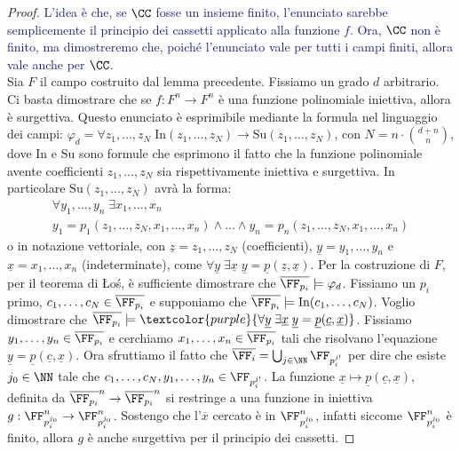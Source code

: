 \begin{proof}
    \textcolor{MidnightBlue}{L'idea è che, se $\CC$ fosse un insieme finito, l'enunciato sarebbe semplicemente il principio dei cassetti applicato alla funzione $f$. Ora, $\CC$ non è finito, ma dimostreremo che,
    poiché l'enunciato vale per tutti i campi finiti, allora vale anche per $\CC$.}\\
    Sia $F$ il campo costruito dal lemma precedente. Fissiamo un grado $d$ arbitrario. Ci basta dimostrare che se $f : F^n \to F^n$ è una funzione polinomiale iniettiva, allora è surgettiva.
    Questo enunciato è esprimibile mediante la formula nel linguaggio dei campi: $\varphi_d = \forall z_1,\ldots,z_N \; \text{In}(z_1,\ldots,z_N) \to \text{Su}(z_1,\ldots,z_N)$, con $N = n \cdot \binom{d+n}{n}$,
    dove $\text{In}$ e $\text{Su}$ sono formule che esprimono il fatto che la funzione polinomiale avente coefficienti $z_1,\ldots,z_N$ sia rispettivamente iniettiva e surgettiva. In particolare
    $\text{Su}(z_1,\ldots,z_N)$ avrà la forma: 
    \begin{multline*}
            \forall y_1,\ldots,y_n \; \exists x_1,\ldots,x_n \\
            y_1 = p_1(z_1,\ldots,z_N,x_1,\ldots,x_n) \land \ldots \land y_n = p_n(z_1,\ldots,z_N,x_1,\ldots,x_n)
    \end{multline*}
    o in notazione vettoriale, con $\underline{z} = z_1,\ldots,z_N$ (coefficienti), $\underline{y} = y_1,\ldots,y_n$ e $\underline{x} = x_1,\ldots,x_n$ (indeterminate), come $\forall \underline{y} \; \exists \underline{x} \; \underline{y} = \underline{p}(\underline{z},\underline{x})$.
    Per la costruzione di $F$, per il teorema di Łoś, è sufficiente dimostrare che $\overline{\FF_{p_i}} \models \varphi_d$. Fissiamo un $p_i$ primo, $c_1,\ldots,c_N \in \overline{\FF_{p_i}}$ e supponiamo che $\overline{\FF_{p_i}} \models \text{In}(c_1,\ldots,c_N)$.
    Voglio dimostrare che $\overline{\FF_{p_i}} \models \textcolor{purple}{\forall \underline{y} \; \exists \underline{x} \; \underline{y} = \underline{p}(\underline{c},\underline{x})}$. Fissiamo $y_1,\ldots,y_n \in \overline{\FF_{p_i}}$ e cerchiamo $x_1,\ldots,x_n \in \overline{\FF_{p_i}}$ tali che
    risolvano l'equazione $\underline{y} = \underline{p}(\underline c, \underline x)$. Ora sfruttiamo il fatto che $\overline{\FF_{i}} = \bigcup_{j \in \NN} \FF_{p_i^{j!}}$ per dire che esiste $j_0 \in \NN$ tale che $c_1,\ldots,c_N,y_1,\ldots,y_n \in \FF_{p_i^{j!}}$.
    La funzione $\underline{x} \mapsto \underline{p}(\underline{c},\underline{x})$, definita da $\overline{\FF_{p_i}}^n \to \overline{\FF_{p_i}}^n$ si restringe a una funzione in iniettiva $g : \FF_{p_i^{j_0}}^n \to \FF_{p_i^{j_0}}^n$. Sostengo che l'$\overline{x}$ cercato è in $\FF_{p_i^{j_0}}^n$, infatti
    siccome $\FF_{p_i^{j_0}}^n$ è finito, allora $g$ è anche surgettiva per il principio dei cassetti.
\end{proof}

